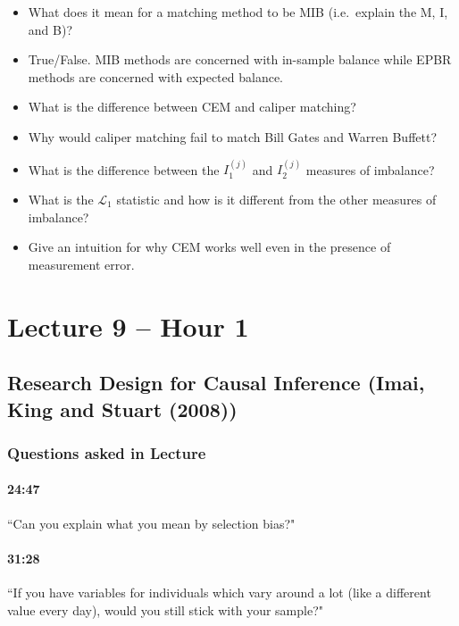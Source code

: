 \documentclass[11pt]{article}
\begin{document}
\begin{itemize}
\item What does it mean for a matching method to be MIB (i.e.\ explain the M, I, and B)?

\item True/False.  MIB methods are concerned with in-sample balance while EPBR methods are concerned with expected balance.

\item What is the difference between CEM and caliper matching?

\item Why would caliper matching fail to match Bill Gates and Warren Buffett?

\item What is the difference between the $I^{(j)}_1$ and $I^{(j)}_2$ measures of imbalance?

\item What is the $\mathcal{L}_1$ statistic and how is it different from the other measures of imbalance?

\item Give an intuition for why CEM works well even in the presence of measurement error.
\end{itemize}

\section{Lecture 9 -- Hour 1}

\subsection{Research Design for Causal Inference (Imai, King and Stuart (2008))}


\subsubsection{Questions asked in Lecture}


\paragraph{24:47} ``Can you explain what you mean by selection bias?"

\paragraph{31:28} ``If you have variables for individuals which vary around a lot (like a different value every day), would you still stick with your sample?"
\end{document}
